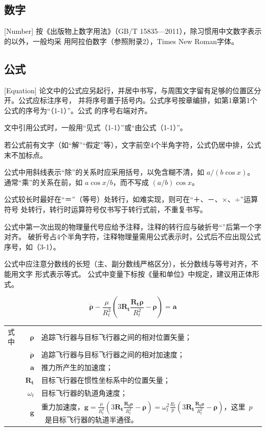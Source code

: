 \subsection{数字}[Number]
按《出版物上数字用法》（GB/T 15835—2011），除习惯用中文数字表示的以外，一般均采
用阿拉伯数字（参照附录2），Times New Roman字体。

\subsection{公式}[Equation]
论文中的公式应另起行，并居中书写，与周围文字留有足够的位置区分开。公式应标注序号，
并将序号置于括号内。公式序号按章编排，如第1章第1个公式的序号为“（1-1）”。公式
的序号右端对齐。

文中引用公式时，一般用“见式（1-1）”或“由公式（1-1）”。

若公式前有文字（如“解”“假定”等），文字前空4个半角字符，公式仍居中排，公式末不加标点。

公式中用斜线表示“除”的关系时应采用括号，以免含糊不清，如 $a/(b\cos x)$。\\
通常“乘”的关系在前，如 $a\cos x/b$，而不写成 $(a/b)\cos x$。


公式较长时最好在“＝”（等号）处转行，如难实现，则可在“＋、－、×、÷”运算符号
处转行，转行时运算符号仅书写于转行式前，不重复书写。

公式中第一次出现的物理量代号应给予注释，注释的转行应与破折号“\cndash”后第一个字对齐。
破折号占4个半角字符，注释物理量需用公式表示时，公式后不应出现公式序号，如（3-1）。

公式中应注意分数线的长短（主、副分数线严格区分），长分数线与等号对齐，不能用文字
形式表示等式。
公式中变量下标按《量和单位》中规定，建议用正体形式。

\begin{equation}\label{eq:2}
  \ddot{\boldsymbol{\rho}}-\frac{\mu}{R_{t}^{3}}\left(3\mathbf{R_{t}}\frac{\mathbf{R_{t}\rho}}{R_{t}^{2}}-\boldsymbol{\rho}\right)=\mathbf{a}
\end{equation}
\begin{tabularx}{\textwidth}{@{}l@{\quad}r@{———}X@{}}
  式中& $\boldsymbol{\rho}$ &追踪飞行器与目标飞行器之间的相对位置矢量；\\
      &  $\boldsymbol{\ddot{\rho}}$&追踪飞行器与目标飞行器之间的相对加速度；\\
      &  $\mathbf{a}$   &推力所产生的加速度；\\
      &  $\mathbf{R_t}$ & 目标飞行器在惯性坐标系中的位置矢量；\\
      &  $\omega_{t}$ & 目标飞行器的轨道角速度；\\
      &  $\mathbf{g}$ & 重力加速度，$\mathbf{g}=\frac{\mu}{R_{t}^{3}}\left(
                        3\mathbf{R_{t}}\frac{\mathbf{R_{t}\rho}}{R_{t}^{2}}-\boldsymbol{\rho}\right)=\omega_{t}^{2}\frac{R_{t}}{p}\left(
                        3\mathbf{R_{t}}\frac{\mathbf{R_{t}\rho}}{R_{t}^{2}}-\boldsymbol{\rho}\right)$，这里~$p$~是目标飞行器的轨道半通径。
\end{tabularx}\vspace{\ccwd}

